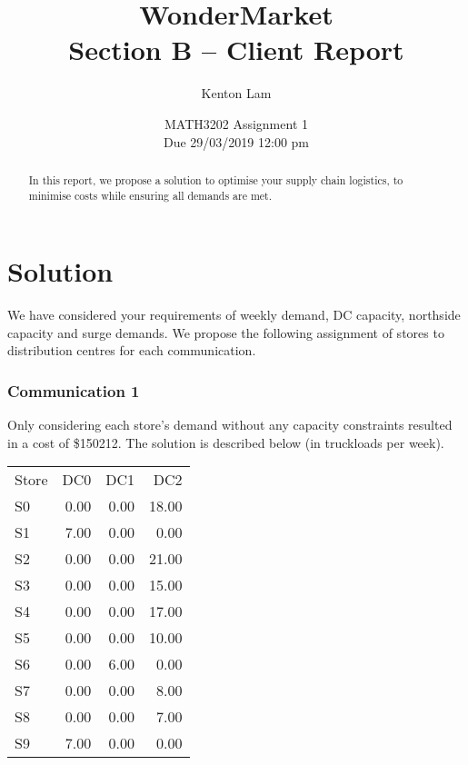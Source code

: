 \documentclass[11pt,a4paper]{article}
\author{Kenton Lam}
\date{{MATH3202 Assignment 1 \\ Due 29/03/2019 12:00 pm}}
\title{WonderMarket \\ 
Section B -- Client Report}
\begin{document}
\maketitle
\begin{abstract}
    In this report, we propose a solution to optimise your supply chain logistics, 
    to minimise costs while ensuring all demands are met.
\end{abstract}

\part{Solution}
We have considered your requirements of weekly demand, DC capacity, northside capacity and surge demands.
We propose the following assignment of stores to distribution centres for each communication.

\section{Communication 1}
Only considering each store's demand without any capacity constraints 
resulted in a cost of \$150212. The solution is described below (in truckloads per week). \\[0.8em]
\begin{tabular}{l  r  r  r }
    Store & DC0 & DC1 & DC2 \\
    S0 & 0.00 & 0.00 & 18.00 \\
    S1 & 7.00 & 0.00 & 0.00 \\
    S2 & 0.00 & 0.00 & 21.00 \\
    S3 & 0.00 & 0.00 & 15.00 \\
    S4 & 0.00 & 0.00 & 17.00 \\
    S5 & 0.00 & 0.00 & 10.00 \\
    S6 & 0.00 & 6.00 & 0.00 \\
    S7 & 0.00 & 0.00 & 8.00 \\
    S8 & 0.00 & 0.00 & 7.00 \\
    S9 & 7.00 & 0.00 & 0.00 \\    
\end{tabular}
\pagebreak
\end{document}

